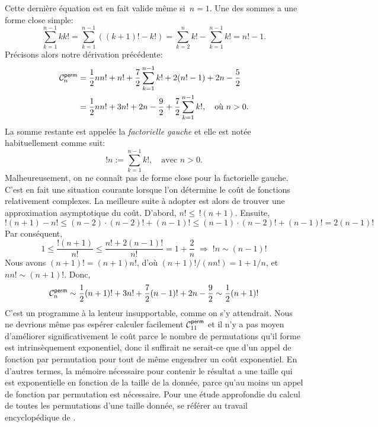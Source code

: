 Cette dernière équation est en fait valide même si~\(n = 1\). Une des
sommes a une forme close simple:
\begin{equation*}
\sum_{k=1}^{n-1}{kk!} = \sum_{k=1}^{n-1}((k+1)! - k!) =
\sum_{k=2}^{n}{k!} - \sum_{k=1}^{n-1}{k!} = n! - 1.
\end{equation*}
Précisons alors notre dérivation précédente:
\begin{align*}
\C{\fun{perm}}{n}
  &= \frac{1}{2}{nn!} + n! + \frac{7}{2}\sum_{k=1}^{n-1}{k!}
     + 2(n! - 1) + 2n - \frac{5}{2}\\
  &= \frac{1}{2}{nn!} + 3n!
     + 2n - \frac{9}{2} + \frac{7}{2}\sum_{k=1}^{n-1}{k!},\quad
     \text{où \(n > 0\)}.
\end{align*}
La somme restante est appelée la \emph{factorielle gauche}
\citep{Kurepa_1971} et elle est notée
habituellement comme suit:
\begin{equation*}
!n := \sum_{k=1}^{n-1}{k!},\quad \text{avec \(n > 0\)}.
\end{equation*}
Malheureusement, on ne connaît pas de forme close pour la factorielle
gauche.  C'est en fait une situation courante lorsque l'on détermine
le coût de fonctions relativement complexes. La meilleure suite à
adopter est alors de trouver une approximation asymptotique du
coût. D'abord, \(n! \leqslant \, !(n+1)\). Ensuite,
\begin{equation*}
!(n+1) - n! \leqslant (n-2) \cdot (n-2)! + (n-1)! \leqslant
(n-1) \cdot (n-2)! + (n-1)! = 2 (n-1)!
\end{equation*}
Par conséquent,
\begin{equation*}
1 \leqslant \frac{!(n+1)}{n!} \leqslant \frac{n! + 2(n-1)!}{n!} = 1 +
\frac{2}{n} \;\Rightarrow\; !n \sim (n-1)!
\end{equation*}
Nous avons \((n+1)! = (n+1)n!\), d'où \((n+1)!/(nn!) = 1 + 1/n\), et
\(nn!  \sim (n+1)!\). Donc,
\begin{equation*}
\abovedisplayshortskip=0pt
\abovedisplayskip=0pt
\C{\fun{perm}}{n} \sim \frac{1}{2}(n+1)! + 3n! + \frac{7}{2}(n-1)!
+ 2n - \frac{9}{2} \sim \frac{1}{2}(n+1)!
\end{equation*}
C'est un programme à la lenteur insupportable, comme on s'y
attendrait. Nous ne devrions même pas espérer calculer facilement
\(\C{\fun{perm}}{11}\)  et il n'y a
pas moyen d'améliorer significativement le coût parce le nombre de
permutations qu'il forme est intrinsèquement exponentiel, donc il
suffirait ne serait-ce que d'un appel de fonction par permutation pour
tout de même engendrer un coût exponentiel. En d'autres termes, la
mémoire nécessaire pour contenir le résultat a une taille qui est
exponentielle en fonction de la taille de la donnée, parce qu'au moins
un appel de fonction par permutation est nécessaire. Pour une étude
approfondie du calcul de toutes les permutations d'une taille donnée,
se référer au travail encyclopédique de \cite{Knuth_2011}.

